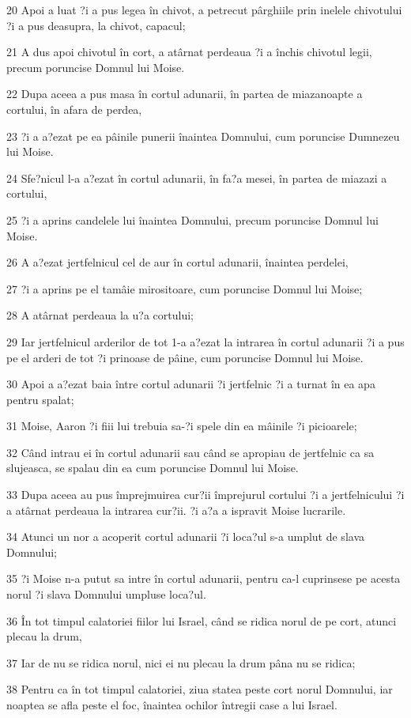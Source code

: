 \par 20 Apoi a luat ?i a pus legea în chivot, a petrecut pârghiile prin inelele chivotului ?i a pus deasupra, la chivot, capacul;
\par 21 A dus apoi chivotul în cort, a atârnat perdeaua ?i a închis chivotul legii, precum poruncise Domnul lui Moise.
\par 22 Dupa aceea a pus masa în cortul adunarii, în partea de miazanoapte a cortului, în afara de perdea,
\par 23 ?i a a?ezat pe ea pâinile punerii înaintea Domnului, cum poruncise Dumnezeu lui Moise.
\par 24 Sfe?nicul l-a a?ezat în cortul adunarii, în fa?a mesei, în partea de miazazi a cortului,
\par 25 ?i a aprins candelele lui înaintea Domnului, precum poruncise Domnul lui Moise.
\par 26 A a?ezat jertfelnicul cel de aur în cortul adunarii, înaintea perdelei,
\par 27 ?i a aprins pe el tamâie mirositoare, cum poruncise Domnul lui Moise;
\par 28 A atârnat perdeaua la u?a cortului;
\par 29 Iar jertfelnicul arderilor de tot 1-a a?ezat la intrarea în cortul adunarii ?i a pus pe el arderi de tot ?i prinoase de pâine, cum poruncise Domnul lui Moise.
\par 30 Apoi a a?ezat baia între cortul adunarii ?i jertfelnic ?i a turnat în ea apa pentru spalat;
\par 31 Moise, Aaron ?i fiii lui trebuia sa-?i spele din ea mâinile ?i picioarele;
\par 32 Când intrau ei în cortul adunarii sau când se apropiau de jertfelnic ca sa slujeasca, se spalau din ea cum poruncise Domnul lui Moise.
\par 33 Dupa aceea au pus împrejmuirea cur?ii împrejurul cortului ?i a jertfelnicului ?i a atârnat perdeaua la intrarea cur?ii. ?i a?a a ispravit Moise lucrarile.
\par 34 Atunci un nor a acoperit cortul adunarii ?i loca?ul s-a umplut de slava Domnului;
\par 35 ?i Moise n-a putut sa intre în cortul adunarii, pentru ca-l cuprinsese pe acesta norul ?i slava Domnului umpluse loca?ul.
\par 36 În tot timpul calatoriei fiilor lui Israel, când se ridica norul de pe cort, atunci plecau la drum,
\par 37 Iar de nu se ridica norul, nici ei nu plecau la drum pâna nu se ridica;
\par 38 Pentru ca în tot timpul calatoriei, ziua statea peste cort norul Domnului, iar noaptea se afla peste el foc, înaintea ochilor întregii case a lui Israel.


